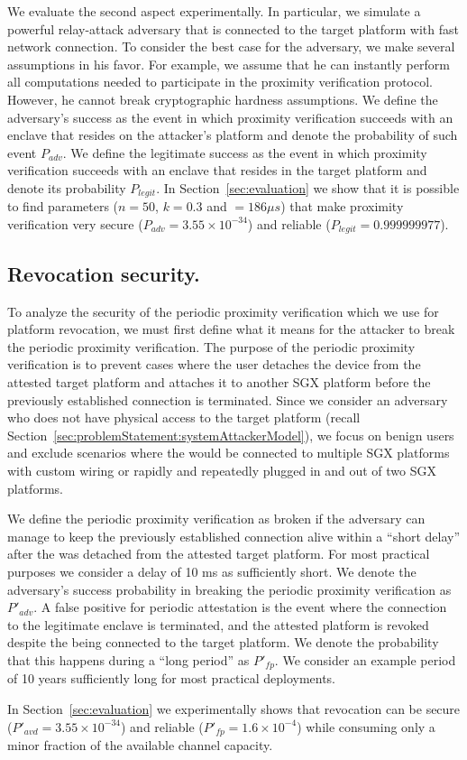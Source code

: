 We evaluate the second aspect experimentally. In particular, we simulate a powerful relay-attack adversary that is connected to the target platform with fast network connection. To consider the best case for the adversary, we make several assumptions in his favor. For example, we assume that he can instantly perform all computations needed to participate in the proximity verification protocol. However, he cannot break cryptographic hardness assumptions. We define the adversary's success as the event in which proximity verification succeeds with an enclave that resides on the attacker's platform and denote the probability of such event $P_{adv}$. We define the legitimate success as the event in which proximity verification succeeds with an enclave that resides in the target platform and denote its probability $P_{legit}$. In Section~\ref{sec:evaluation} we show that it is possible to find parameters ($n=50$, $k=0.3$ and \connect$=186 \mu s$) that make proximity verification very secure ($P_{adv}=3.55\times 10^{-34}$) and reliable ($P_{legit}=0.999999977$).




\subsection{Revocation security.}
To analyze the security of the periodic proximity verification which we use for platform revocation, we must first define what it means for the attacker to break the periodic proximity verification. The purpose of the periodic proximity verification is to prevent cases where the user detaches the \device device from the attested target platform and attaches it to another SGX platform before the previously established connection is terminated. Since we consider an adversary who does not have physical access to the target platform (recall Section~\ref{sec:problemStatement:systemAttackerModel}), we focus on benign users and exclude scenarios where the \device would be connected to multiple SGX platforms with custom wiring or rapidly and repeatedly plugged in and out of two SGX platforms.



We define the periodic proximity verification as broken if the adversary can manage to keep the previously established connection alive within a ``short delay'' after the \device was detached from the attested target platform. For most practical purposes we consider a delay of 10 ms as sufficiently short. We denote the adversary's success probability in breaking the periodic proximity verification as $P'_{adv}$.
%
A false positive for periodic attestation is the event where the connection to the legitimate enclave is terminated, and the attested platform is revoked despite the \device being connected to the target platform. We denote the probability that this happens during a ``long period'' as $P'_{fp}$. We consider an example period of 10 years sufficiently long for most practical deployments.

In Section~\ref{sec:evaluation} we experimentally shows that revocation can be secure ($P'_{avd}=3.55\times10^{-34}$) and reliable
($P'_{fp}=1.6\times10^{-4}$) while consuming only a minor fraction of the available channel capacity.
